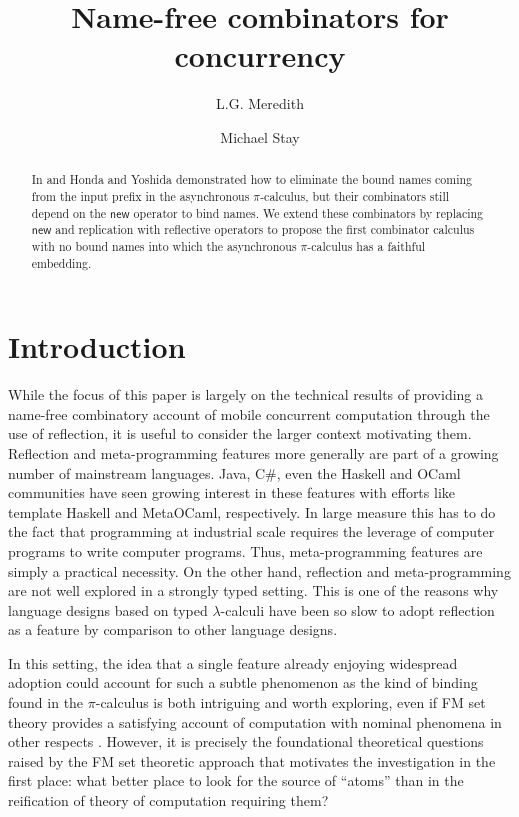 \documentclass[submission,copyright,creativecommons]{eptcs}
\title{Name-free combinators for concurrency}
\author{L.G. Meredith
\institute{RChain Cooperative\\ Washington State}
\email{lgreg.meredith@rchain.coop}
\and
Michael Stay
\institute{Pyrofex Corp.\\Utah, USA}
\email{\quad stay@pyrofex.net}
}
\newcommand{\new}{\mathsf{new}}
\newcommand{\pic}{$\pi$-calculus}
\theoremstyle{definition}
\theoremstyle{remark}
\theoremstyle{remark}
\begin{document}
\maketitle
\begin{abstract}
\noindent
  In \cite{DBLP:conf/popl/HondaY94} and
  \cite{DBLP:journals/tcs/Yoshida02} Honda and Yoshida demonstrated
  how to eliminate the bound names coming from the input prefix in the
  asynchronous {\pic}, but their combinators still depend on the
  $\new$ operator to bind names.  We extend these combinators by
  replacing $\new$ and replication with reflective operators to
  propose the first combinator calculus with no bound names into which
  the asynchronous {\pic} has a faithful embedding.
\end{abstract}

\section{Introduction}

While the focus of this paper is largely on the technical results of
providing a name-free combinatory account of mobile concurrent
computation through the use of reflection, it is useful to consider
the larger context motivating them. Reflection and meta-programming
features more generally are part of a growing number of mainstream
languages. Java, C\#, even the Haskell and OCaml communities have seen
growing interest in these features with efforts like template Haskell
and MetaOCaml, respectively. In large measure this has to do the fact
that programming at industrial scale requires the leverage of computer
programs to write computer programs. Thus, meta-programming features
are simply a practical necessity. On the other hand, reflection and
meta-programming are not well explored in a strongly typed
setting. This is one of the reasons why language designs based on
typed $\lambda$-calculi have been so slow to adopt reflection as a
feature by comparison to other language designs.

In this setting, the idea that a single feature already enjoying
widespread adoption could account for such a subtle phenomenon as the
kind of binding found in the {\pic} is both intriguing and worth
exploring, even if FM set theory provides a satisfying account of
computation with nominal phenomena in other respects
\cite{DBLP:journals/fac/GabbayP02}. However, it is precisely the
foundational theoretical questions raised by the FM set theoretic
approach that motivates the investigation in the first place: what
better place to look for the source of ``atoms'' than in the
reification of theory of computation requiring them?
\end{document}
